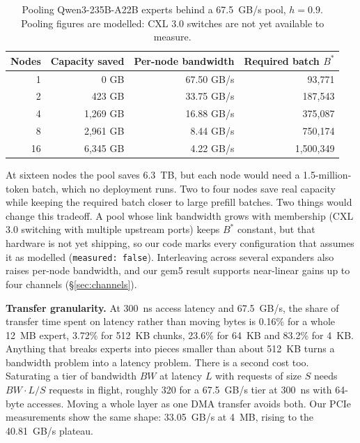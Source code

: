 \documentclass[10pt,a4paper]{article}
\begin{document}
\begin{table}[htbp]
\centering\small
\caption{Pooling Qwen3-235B-A22B experts behind a 67.5~GB/s pool, $h=0.9$. Pooling
figures are modelled: CXL 3.0 switches are not yet available to measure.}
\label{tab:pooling}
\begin{tabular}{rrrr}
\toprule
Nodes & Capacity saved & Per-node bandwidth & Required batch $B^{*}$ \\
\midrule
1  &        0 GB & 67.50 GB/s &    93{,}771 \\
2  &      423 GB & 33.75 GB/s &   187{,}543 \\
4  & 1{,}269 GB & 16.88 GB/s &   375{,}087 \\
8  & 2{,}961 GB &  8.44 GB/s &   750{,}174 \\
16 & 6{,}345 GB &  4.22 GB/s & 1{,}500{,}349 \\
\bottomrule
\end{tabular}
\end{table}

At sixteen nodes the pool saves 6.3~TB, but each node would need a 1.5-million-token
batch, which no deployment runs. Two to four nodes save real capacity while keeping
the required batch closer to large prefill batches. Two things would change this
tradeoff. A pool whose link bandwidth grows with membership (CXL 3.0 switching with
multiple upstream ports) keeps $B^{*}$ constant, but that hardware is
not yet shipping, so our code marks every configuration that assumes it as
modelled (\texttt{measured: false}). Interleaving across several expanders also
raises per-node bandwidth, and our gem5 result supports near-linear gains up to
four channels (\S\ref{sec:channels}).

\textbf{Transfer granularity.}
\label{sec:granularity}
At 300~ns access latency and 67.5~GB/s, the share of transfer time spent on
latency rather than moving bytes is 0.16\% for a whole 12~MB expert, 3.72\% for
512~KB chunks, 23.6\% for 64~KB and 83.2\% for 4~KB. Anything that breaks
experts into pieces smaller than about 512~KB turns a bandwidth problem into a
latency problem. There is a second cost too. Saturating a tier of bandwidth $BW$
at latency $L$ with requests of size $S$ needs $BW \cdot L / S$ requests in flight,
roughly 320 for a 67.5~GB/s tier at 300~ns with 64-byte accesses. Moving a
whole layer as one DMA transfer avoids both. Our PCIe measurements show the same
shape: 33.05~GB/s at 4~MB, rising to the 40.81~GB/s plateau.

\end{document}
